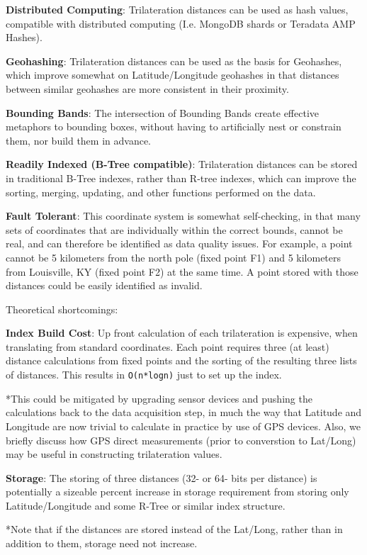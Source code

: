 \documentclass[]{article}
\begin{document}
\textbf{Distributed Computing}: Trilateration distances can be used as
hash values, compatible with distributed computing (I.e. MongoDB shards
or Teradata AMP Hashes).

\textbf{Geohashing}: Trilateration distances can be used as the basis
for Geohashes, which improve somewhat on Latitude/Longitude geohashes in
that distances between similar geohashes are more consistent in their
proximity.

\textbf{Bounding Bands}: The intersection of Bounding Bands create
effective metaphors to bounding boxes, without having to artificially
nest or constrain them, nor build them in advance.

\textbf{Readily Indexed (B-Tree compatible)}: Trilateration distances
can be stored in traditional B-Tree indexes, rather than R-tree indexes,
which can improve the sorting, merging, updating, and other functions
performed on the data.

\textbf{Fault Tolerant}: This coordinate system is somewhat
self-checking, in that many sets of coordinates that are individually
within the correct bounds, cannot be real, and can therefore be
identified as data quality issues. For example, a point cannot be 5
kilometers from the north pole (fixed point F1) and 5 kilometers from
Louisville, KY (fixed point F2) at the same time. A point stored with
those distances could be easily identified as invalid.

Theoretical shortcomings:

\textbf{Index Build Cost}: Up front calculation of each trilateration is
expensive, when translating from standard coordinates. Each point
requires three (at least) distance calculations from fixed points and
the sorting of the resulting three lists of distances. This results in
\texttt{O(n*logn)} just to set up the index.

*This could be mitigated by upgrading sensor devices and pushing the
calculations back to the data acquisition step, in much the way that
Latitude and Longitude are now trivial to calculate in practice by use
of GPS devices. Also, we briefly discuss how GPS direct measurements
(prior to converstion to Lat/Long) may be useful in constructing
trilateration values.

\textbf{Storage}: The storing of three distances (32- or 64- bits per
distance) is potentially a sizeable percent increase in storage
requirement from storing only Latitude/Longitude and some R-Tree or
similar index structure.

*Note that if the distances are stored instead of the Lat/Long, rather
than in addition to them, storage need not increase.
\end{document}
